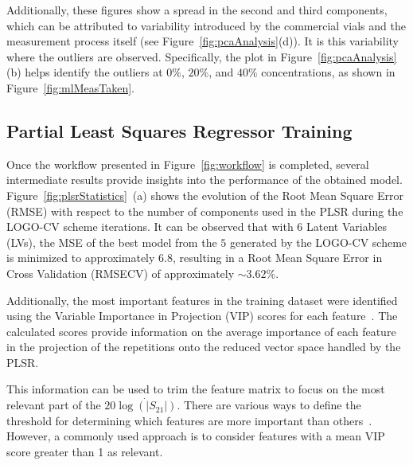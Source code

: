 \documentclass[journal,twoside,web]{ieeecolor}
\begin{document}
Additionally, these figures show a spread in the second and third components, which can be attributed to variability introduced by the commercial vials and the measurement process itself (see Figure~\ref{fig:pcaAnalysis}(d)). It is this variability where the outliers are observed. Specifically, the plot in Figure~\ref{fig:pcaAnalysis}(b) helps identify the outliers at $0\%$, $20\%$, and $40\%$ concentrations, as shown in Figure~\ref{fig:mlMeasTaken}.   

\subsection{Partial Least Squares Regressor Training}
\label{ssec:plsRegressor}

Once the workflow presented in Figure~\ref{fig:workflow} is completed, several intermediate results provide insights into the performance of the obtained model. Figure~\ref{fig:plsrStatistics}~(a) shows the evolution of the Root Mean Square Error (RMSE) with respect to the number of components used in the PLSR during the LOGO-CV scheme iterations. It can be observed that with 6 Latent Variables (LVs), the MSE of the best model from the $5$ generated by the LOGO-CV scheme is minimized to approximately $6.8$, resulting in a Root Mean Square Error in Cross Validation (RMSECV) of approximately $\sim3.62\%$.

Additionally, the most important features in the training dataset were identified using the Variable Importance in Projection (VIP) scores for each feature~\cite{Chong2005}. The calculated scores provide information on the average importance of each feature in the projection of the repetitions onto the reduced vector space handled by the PLSR.

This information can be used to trim the feature matrix to focus on the most relevant part of the $20\dot{\log\left(|S_{21}|\right)}$. There are various ways to define the threshold for determining which features are more important than others~\cite{Ansari2015}. However, a commonly used approach is to consider features with a mean VIP score greater than 1 as relevant.
\end{document}
